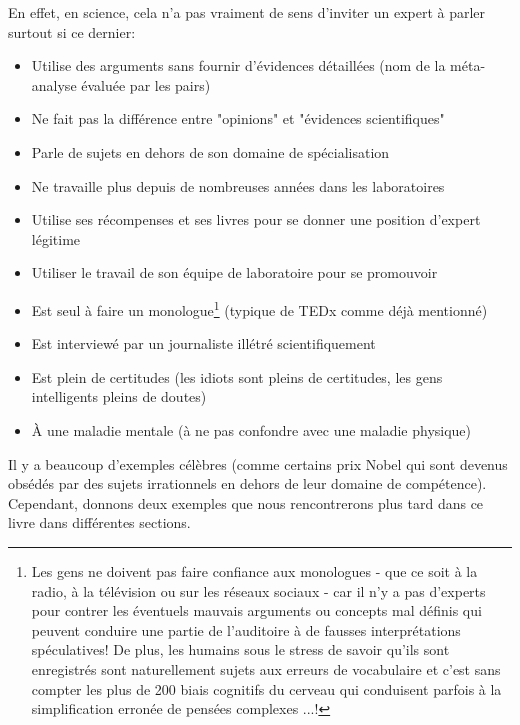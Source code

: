 	En effet, en science, cela n'a pas vraiment de sens d'inviter un expert à parler surtout si ce dernier:
	\begin{itemize}
		\item Utilise des arguments sans fournir d'évidences détaillées (nom de la méta-analyse évaluée par les pairs)
		
		\item Ne fait pas la différence entre  "opinions" et "évidences scientifiques"
		
		\item Parle de sujets en dehors de son domaine de spécialisation
		
		\item Ne travaille plus depuis de nombreuses années dans les laboratoires
		
		\item Utilise ses récompenses et ses livres pour se donner une position d'expert légitime
		
		\item Utiliser le travail de son équipe de laboratoire pour se promouvoir
		
		\item Est seul à faire un monologue\footnote{Les gens ne doivent pas faire confiance aux monologues - que ce soit à la radio, à la télévision ou sur les réseaux sociaux - car il n'y a pas d'experts pour contrer les éventuels mauvais arguments ou concepts mal définis qui peuvent conduire une partie de l'auditoire à de fausses interprétations spéculatives! De plus, les humains sous le stress de savoir qu'ils sont enregistrés sont naturellement sujets aux erreurs de vocabulaire et c'est sans compter les plus de 200 biais cognitifs du cerveau qui conduisent parfois à la simplification erronée de pensées complexes ...!} (typique de TEDx comme déjà mentionné)
		
		\item Est interviewé par un journaliste illétré scientifiquement
		
		\item Est plein de certitudes (les idiots sont pleins de certitudes, les gens intelligents pleins de doutes)
		
		\item À une maladie mentale (à ne pas confondre avec une maladie physique)
	\end{itemize}
	Il y a beaucoup d'exemples célèbres (comme certains prix Nobel qui sont devenus obsédés par des sujets irrationnels en dehors de leur domaine de compétence). Cependant, donnons deux exemples que nous rencontrerons plus tard dans ce livre dans différentes sections.
	
